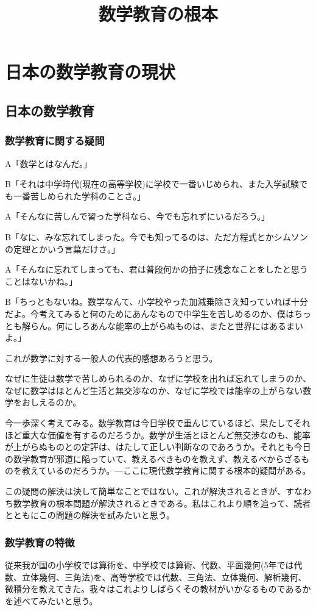 \documentclass[11pt,a4paper]{jsarticle}
\title{数学教育の根本}
\begin{document}
\maketitle
%
%
\section{日本の数学教育の現状}

\subsection{日本の数学教育}
\subsubsection{数学教育に関する疑問}
A「数学とはなんだ。」

B「それは中学時代(現在の高等学校)に学校で一番いじめられ、また入学試験でも一番苦しめられた学科のことさ。」

A「そんなに苦しんで習った学科なら、今でも忘れずにいるだろう。」

B「なに、みな忘れてしまった。今でも知ってるのは、ただ方程式とかシムソンの定理とかいう言葉だけさ。」

A「そんなに忘れてしまっても、君は普段何かの拍子に残念なことをしたと思うことはないかね。」

B「ちっともないね。数学なんて、小学校やった加減乗除さえ知っていれば十分だよ。今考えてみると何のためにあんなもので中学生を苦しめるのか、僕はちっとも解らん。何にしろあんな能率の上がらぬものは、またと世界にはあるまいよ。」

これが数学に対する一般人の代表的感想あろうと思う。

なぜに生徒は数学で苦しめられるのか、なぜに学校を出れば忘れてしまうのか、なぜに数学はほとんど生活と無交渉なのか、なぜに学校では能率の上がらない数学をおしえるのか。

今一歩深く考えてみる。数学教育は今日学校で重んじているほど、果たしてそれほど重大な価値を有するのだろうか。数学が生活とほとんど無交渉なのも、能率が上がらぬものとの定評は、はたして正しい判断なのであろうか。それとも今日の数学教育が邪道に陥っていて、教えるべきものを教えず、教えるべからざるものを教えているのだろうか。---ここに現代数学教育に関する根本的疑問がある。

この疑問の解決は決して簡単なことではない。これが解決されるときが、すなわち数学教育の根本問題が解決されるときである。私はこれより順を追って、読者とともにこの問題の解決を試みたいと思う。

\subsubsection{数学教育の特徴}
従来我が国の小学校では算術を、中学校では算術、代数、平面幾何(5年では代数、立体幾何、三角法)を、高等学校では代数、三角法、立体幾何、解析幾何、微積分を教えてきた。我々はこれよりしばらくその教材がいかなるものであるかを述べてみたいと思う。



%
%
\end{document}

